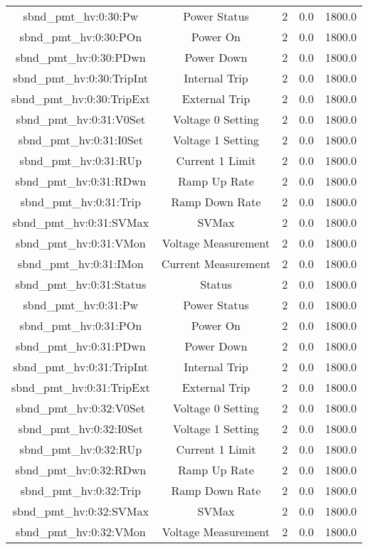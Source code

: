 \begin{table}[ptb]
\begin{tabular}{c | c c c c}
sbnd_pmt_hv:0:30:Pw & Power Status & 2 & 0.0 & 1800.0\\ 
sbnd_pmt_hv:0:30:POn & Power On & 2 & 0.0 & 1800.0\\ 
sbnd_pmt_hv:0:30:PDwn & Power Down & 2 & 0.0 & 1800.0\\ 
sbnd_pmt_hv:0:30:TripInt & Internal Trip & 2 & 0.0 & 1800.0\\ 
sbnd_pmt_hv:0:30:TripExt & External Trip & 2 & 0.0 & 1800.0\\ 
sbnd_pmt_hv:0:31:V0Set & Voltage 0 Setting & 2 & 0.0 & 1800.0\\ 
sbnd_pmt_hv:0:31:I0Set & Voltage 1 Setting & 2 & 0.0 & 1800.0\\ 
sbnd_pmt_hv:0:31:RUp & Current 1 Limit & 2 & 0.0 & 1800.0\\ 
sbnd_pmt_hv:0:31:RDwn & Ramp Up Rate & 2 & 0.0 & 1800.0\\ 
sbnd_pmt_hv:0:31:Trip & Ramp Down Rate & 2 & 0.0 & 1800.0\\ 
sbnd_pmt_hv:0:31:SVMax & SVMax & 2 & 0.0 & 1800.0\\ 
sbnd_pmt_hv:0:31:VMon & Voltage Measurement & 2 & 0.0 & 1800.0\\ 
sbnd_pmt_hv:0:31:IMon & Current Measurement & 2 & 0.0 & 1800.0\\ 
sbnd_pmt_hv:0:31:Status & Status & 2 & 0.0 & 1800.0\\ 
sbnd_pmt_hv:0:31:Pw & Power Status & 2 & 0.0 & 1800.0\\ 
sbnd_pmt_hv:0:31:POn & Power On & 2 & 0.0 & 1800.0\\ 
sbnd_pmt_hv:0:31:PDwn & Power Down & 2 & 0.0 & 1800.0\\ 
sbnd_pmt_hv:0:31:TripInt & Internal Trip & 2 & 0.0 & 1800.0\\ 
sbnd_pmt_hv:0:31:TripExt & External Trip & 2 & 0.0 & 1800.0\\ 
sbnd_pmt_hv:0:32:V0Set & Voltage 0 Setting & 2 & 0.0 & 1800.0\\ 
sbnd_pmt_hv:0:32:I0Set & Voltage 1 Setting & 2 & 0.0 & 1800.0\\ 
sbnd_pmt_hv:0:32:RUp & Current 1 Limit & 2 & 0.0 & 1800.0\\ 
sbnd_pmt_hv:0:32:RDwn & Ramp Up Rate & 2 & 0.0 & 1800.0\\ 
sbnd_pmt_hv:0:32:Trip & Ramp Down Rate & 2 & 0.0 & 1800.0\\ 
sbnd_pmt_hv:0:32:SVMax & SVMax & 2 & 0.0 & 1800.0\\ 
sbnd_pmt_hv:0:32:VMon & Voltage Measurement & 2 & 0.0 & 1800.0\\ 

\end{tabular}
\end{table}
